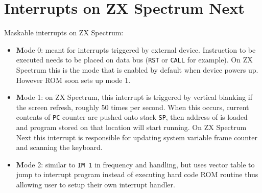 \section{Interrupts on ZX Spectrum Next}
\label{zx_next_interrupts}


Maskable interrupts on ZX Spectrum:

\begin{itemize}
    \item {\textbf Mode 0}: meant for interrupts triggered by external device. Instruction to be executed needs to be placed on data bus ({\tt RST} or {\tt CALL} for example). On ZX Spectrum this is the mode that is enabled by default when device powers up. However ROM soon sets up mode 1.
	
    \item {\textbf Mode 1}: on ZX Spectrum, this interrupt is triggered by vertical blanking if the screen refresh, roughly 50 times per second. When this occurs, current contents of {\tt PC} counter are pushed onto stack {\tt SP}, then address of  is loaded and program stored on that location will start running. On ZX Spectrum Next this interrupt is responsible for updating system variable frame counter and scanning the keyboard.
	
    \item {\textbf Mode 2}: similar to {\tt IM 1} in frequency and handling, but uses vector table to jump to interrupt program instead of executing hard code ROM routine thus allowing user to setup their own interrupt handler.
\end{itemize}

